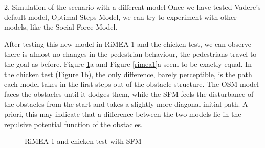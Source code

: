 \begin{task}{2, Simulation of the scenario with a different model}
Once we have tested Vadere's default model, Optimal Steps Model, we can try to experiment with other models, like the Social Force Model.

After testing this new model in RiMEA 1 and the chicken test, we can observe there is almost no changes in the pedestrian behaviour, the pedestrians travel to the goal as before. Figure \ref{rimeachickensfm}a and Figure \ref{rimea1}a seem to be exactly equal. In the chicken test (Figure \ref{rimeachickensfm}b), the only difference, barely perceptible, is the path each model takes in the first steps out of the obstacle structure. The OSM model faces the obstacles until it dodges them, while the SFM feels the disturbance of the obstacles from the start and takes a slightly more diagonal initial path. A priori, this may indicate that a difference between the two models lie in the repulsive potential function of the obstacles.

\begin{figure}[H] 
\centering
{}
\caption{RiMEA 1 and chicken test with SFM}
\label{rimeachickensfm}
\end{figure}


\end{task}
